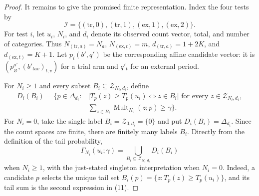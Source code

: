 \documentclass{article}
\begin{document}
\begin{proof}
It remains to give the promised finite representation. Index the four tests by
\[
 \mathcal I=\{(\mathrm{tr},0),(\mathrm{tr},1),(\mathrm{ex},1),(\mathrm{ex},2)\}.
\]
For test \(i\), let \(u_i\), \(N_i\), and \(d_i\) denote its observed count vector, total, and number of categories. Thus \(N_{(\mathrm{tr},a)}=N_a\), \(N_{(\mathrm{ex},t)}=m\), \(d_{(\mathrm{tr},a)}=1+2K\), and \(d_{(\mathrm{ex},t)}=K+1\). Let \(p_i(b',q')\) be the corresponding affine candidate vector: it is \((p^{a\prime}_{\varnothing},(b'_{tav})_{t,v})\) for a trial arm and \(q'_t\) for an external period.

For \(N_i\geq1\) and every subset \(B_i\subseteq\mathcal Z_{N_i,d_i}\), define
\[
 \begin{aligned}
 D_i(B_i)=\biggl\{p\in\Delta_{d_i}:{}&
 \bigl[T_p(z)\geq T_p(u_i)\iff z\in B_i\bigr]
       \text{ for every }z\in\mathcal Z_{N_i,d_i},\\
 &\sum_{z\in B_i}\operatorname{Mult}_{N_i}(z;p)\geq\gamma
 \biggr\}. \tag{11}
 \end{aligned}
\]
For \(N_i=0\), take the single label \(B_i=\mathcal Z_{0,d_i}=\{0\}\) and put \(D_i(B_i)=\Delta_{d_i}\). Since the count spaces are finite, there are finitely many labels \(B_i\). Directly from the definition of the tail probability,
\[
 \Gamma_{N_i}(u_i;\gamma)=\bigcup_{B_i\subseteq\mathcal Z_{N_i,d_i}}D_i(B_i) \tag{12}
\]
when \(N_i\geq1\), with the just-stated singleton interpretation when \(N_i=0\). Indeed, a candidate \(p\) selects the unique tail set \(B_i(p)=\{z:T_p(z)\geq T_p(u_i)\}\), and its tail sum is the second expression in (11).


\end{proof}
\end{document}
